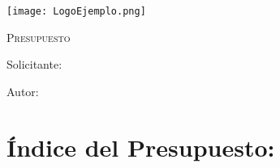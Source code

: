 \documentclass[main]{subfiles}
\begin{document}
\newpage
\thispagestyle{empty}
\begin{center}
    \centering
    \texttt{[image: LogoEjemplo.png]} \par
    \vspace{3 cm}
    {\scshape\Huge Presupuesto \par}
    \vspace{1.5cm}
    {\itshape\Huge \TituloProyecto \par}
    \vfill
    {\Large Solicitante:  \Solicitante \par}
    \vspace{0.5cm}
    {\Large Autor:  \Autor \par}
    \vspace{1.5cm}
    {\Large \Fecha \par}
\end{center}


\chapter*{Índice del Presupuesto:}



\end{document}
